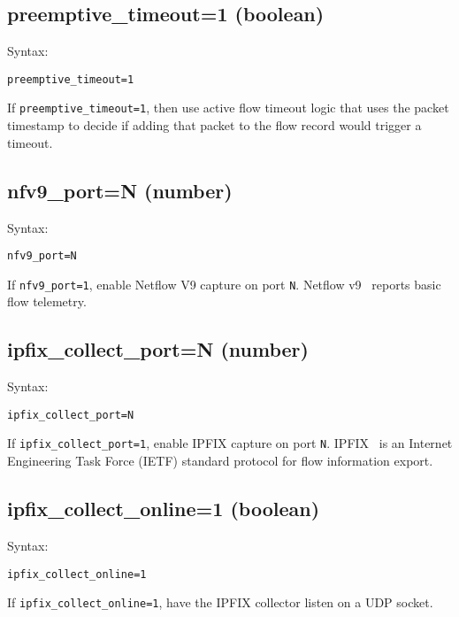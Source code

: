\documentclass{book}
\begin{document}
\subsection{preemptive\_timeout=1 (boolean)}
\label{preemptivetimeout}
\begin{mdframed}[style=aaa]
Syntax:
  \begin{verbatim}
preemptive_timeout=1   
  \end{verbatim}
\end{mdframed}
If \texttt{preemptive\_timeout=1}, then use active flow timeout logic
that uses the packet timestamp to decide if adding that packet to the
flow record would trigger a timeout.

\subsection{nfv9\_port=N (number)}
\label{nfv9port}
\begin{mdframed}[style=aaa]
Syntax:
  \begin{verbatim}
nfv9_port=N                
  \end{verbatim}
\end{mdframed}
If \texttt{nfv9\_port=1}, enable Netflow V9 capture on port \texttt{N}.
Netflow v9~\cite{rfc3954} reports basic flow telemetry.


\subsection{ipfix\_collect\_port=N (number)}
\label{ipfixcollectport}
\begin{mdframed}[style=aaa]
Syntax:
  \begin{verbatim}
ipfix_collect_port=N       
  \end{verbatim}
\end{mdframed}
If \texttt{ipfix\_collect\_port=1}, enable IPFIX capture on port \texttt{N}.
IPFIX~\cite{rfc3955,rfc5101,rfc5103,rfc5153,rfc5472,rfc5473,rfc5610,rfc5655}
is an Internet Engineering Task Force (IETF) standard protocol for
flow information export.

\subsection{ipfix\_collect\_online=1 (boolean)}
\label{ipfixcollectonline}
\begin{mdframed}[style=aaa]
Syntax:
  \begin{verbatim}
ipfix_collect_online=1     
  \end{verbatim}
\end{mdframed}
If \texttt{ipfix\_collect\_online=1}, have the IPFIX collector listen
on a UDP socket.
\end{document}
